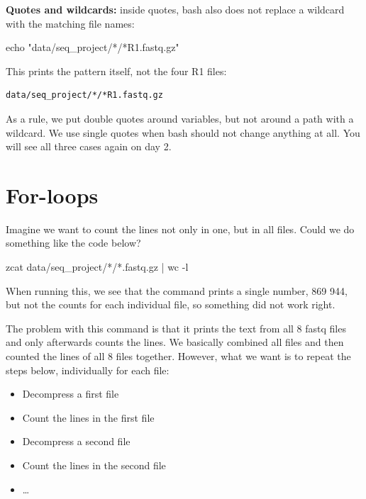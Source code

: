 \documentclass[
  letterpaper,
  DIV=11,
  numbers=noendperiod]{scrreprt}
\newenvironment{Shaded}{}{}
\newcommand{\AttributeTok}[1]{\textcolor[rgb]{0.84,0.23,0.29}{#1}}
\newcommand{\BuiltInTok}[1]{\textcolor[rgb]{0.84,0.23,0.29}{#1}}
\newcommand{\FunctionTok}[1]{\textcolor[rgb]{0.44,0.26,0.76}{#1}}
\newcommand{\KeywordTok}[1]{\textcolor[rgb]{0.84,0.23,0.29}{#1}}
\newcommand{\NormalTok}[1]{\textcolor[rgb]{0.14,0.16,0.18}{#1}}
\newcommand{\PreprocessorTok}[1]{\textcolor[rgb]{0.84,0.23,0.29}{#1}}
\newcommand{\StringTok}[1]{\textcolor[rgb]{0.01,0.18,0.38}{#1}}
\providecommand{\tightlist}{%
  \setlength{\itemsep}{0pt}\setlength{\parskip}{0pt}}
\begin{document}
\begin{tcolorbox}
\textbf{Quotes and wildcards:} inside quotes, bash also does not replace
a wildcard with the matching file names:

\begin{Shaded}
\begin{Highlighting}[]
\BuiltInTok{echo} \StringTok{"data/seq\_project/*/*R1.fastq.gz"}
\end{Highlighting}
\end{Shaded}

This prints the pattern itself, not the four R1 files:

\begin{verbatim}
data/seq_project/*/*R1.fastq.gz
\end{verbatim}

As a rule, we put double quotes around variables, but not around a path
with a wildcard. We use single quotes when bash should not change
anything at all. You will see all three cases again on day 2.

\end{tcolorbox}

\section{For-loops}\label{for-loops}

Imagine we want to count the lines not only in one, but in all files.
Could we do something like the code below?

\begin{Shaded}
\begin{Highlighting}[]
\FunctionTok{zcat}\NormalTok{ data/seq\_project/}\PreprocessorTok{*}\NormalTok{/}\PreprocessorTok{*}\NormalTok{.fastq.gz }\KeywordTok{|} \FunctionTok{wc} \AttributeTok{{-}l}
\end{Highlighting}
\end{Shaded}

When running this, we see that the command prints a single number, 869
944, but not the counts for each individual file, so something did not
work right.

The problem with this command is that it prints the text from all 8
fastq files and only afterwards counts the lines. We basically combined
all files and then counted the lines of all 8 files together. However,
what we want is to repeat the steps below, individually for each file:

\begin{itemize}
\tightlist
\item
  Decompress a first file
\item
  Count the lines in the first file
\item
  Decompress a second file
\item
  Count the lines in the second file
\item
  \ldots{}
\end{itemize}
\end{document}
